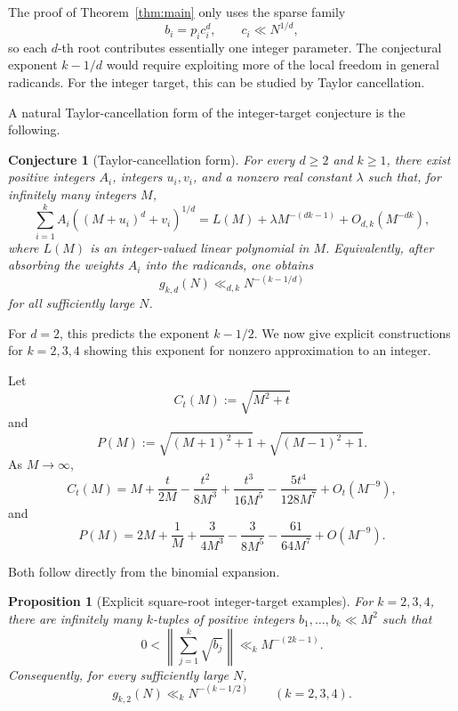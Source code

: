 \documentclass[11pt]{article}
\newtheorem{proposition}[theorem]{Proposition}
\newtheorem{conjecture}[theorem]{Conjecture}
\theoremstyle{remark}
\begin{document}
The proof of Theorem~\ref{thm:main} only uses the sparse family
\[
  b_i=p_i c_i^d,
  \qquad c_i\ll N^{1/d},
\]
so each $d$-th root contributes essentially one integer parameter. The conjectural exponent $k-1/d$ would require exploiting more of the local freedom in general radicands. For the integer target, this can be studied by Taylor cancellation.

\bigskip
\noindent
A natural Taylor-cancellation form of the integer-target conjecture is the following.

\begin{conjecture}[Taylor-cancellation form]\label{conj:taylor}
For every $d\geq 2$ and $k\geq 1$, there exist positive integers $A_i$, integers $u_i,v_i$, and a nonzero real constant $\lambda$ such that, for infinitely many integers $M$,
\[
  \sum_{i=1}^k A_i\left((M+u_i)^d+v_i\right)^{1/d}
  =L(M)+\lambda M^{-(dk-1)}+O_{d,k}(M^{-dk}),
\]
where $L(M)$ is an integer-valued linear polynomial in $M$.
Equivalently, after absorbing the weights $A_i$ into the radicands, one obtains
\[
  g_{k,d}(N)\ll_{d,k} N^{-(k-1/d)}
\]
for all sufficiently large $N$.
\end{conjecture}

\smallskip
\noindent
For $d=2$, this predicts the exponent $k-1/2$. We now give explicit constructions for $k=2,3,4$ showing this exponent for nonzero approximation to an integer.

\bigskip
\noindent
Let
\[
  C_t(M):=\sqrt{M^2+t}
\]
and
\[
  P(M):=\sqrt{(M+1)^2+1}+\sqrt{(M-1)^2+1}.
\]
As $M\to\infty$,
\[
  C_t(M)=M+\frac{t}{2M}-\frac{t^2}{8M^3}
  +\frac{t^3}{16M^5}-\frac{5t^4}{128M^7}+O_t(M^{-9}),
  \tag{5.1}\label{eq:C-expansion}
\]
and
\[
  P(M)=2M+\frac1M+\frac{3}{4M^3}-\frac{3}{8M^5}
  -\frac{61}{64M^7}+O(M^{-9}).
  \tag{5.2}\label{eq:P-expansion}
\]

\smallskip
\noindent
Both follow directly from the binomial expansion.

\begin{proposition}[Explicit square-root integer-target examples]\label{prop:examples}
For $k=2,3,4$, there are infinitely many $k$-tuples of positive integers $b_1,\ldots,b_k\ll M^2$ such that
\[
  0<\left\|\sum_{j=1}^k\sqrt{b_j}\right\|
  \ll_k M^{-(2k-1)}.
\]
Consequently, for every sufficiently large $N$,
\[
  g_{k,2}(N)\ll_k N^{-(k-1/2)}
  \qquad(k=2,3,4).
\]
\end{proposition}
\end{document}
